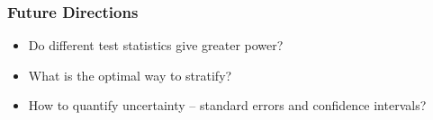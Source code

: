 \documentclass{beamer}
\begin{document}
\frame
{
  \frametitle{Future Directions}
\begin{center}
\begin{itemize}
\item Do different test statistics give greater power?
\item What is the optimal way to stratify?
\item How to quantify uncertainty -- standard errors and confidence intervals?
\end{itemize}
\end{center}
}



%
%
%
\end{document}
